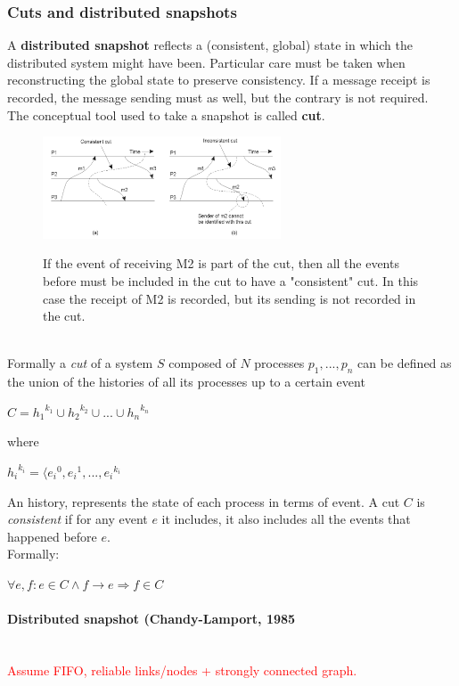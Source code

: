 \documentclass[10pt,a4paper]{article}
\newcommand{\myparagraph}[1]{\paragraph{#1}\mbox{}\\[0.05in]}
\begin{document}
\subsubsection{Cuts and distributed snapshots}
A \textbf{distributed snapshot} reflects a (consistent, global) state in which the distributed system might have been. Particular care must be taken when reconstructing the global state to preserve consistency. If a message receipt is recorded, the message sending must as well, but the contrary is not required. \\
The conceptual tool used to take a snapshot is called \textbf{cut}.
\begin{figure}[h!]
 \hfill \includegraphics[width=200pt]{images/cut.png}\hspace*{\fill}
  \label{fig:cut}
  \caption{If the event of receiving M2 is part of the cut, then all the events before must be included in the cut to have a "consistent" cut. In this case the receipt of M2 is recorded, but its sending is not recorded in the cut.}
\end{figure} \pagebreak \\
Formally a \textit{cut} of a system $S$ composed of $N$ processes $p_1, ..., p_n$ can be defined as the union of the histories of all its processes up to a certain event 
\begin{description}
	\item $C={h_1}^{k_1} \cup {h_2}^{k_2} \cup ... \cup {h_n}^{k_n}$ 
	\item where
	\item ${h_i}^{k_i}=\langle {e_i}^0, {e_i}^1, ..., {e_i}^{k_i}$
\end{description}
An history, represents the state of each process in terms of event.
A cut $C$ is \textit{consistent} if for any event $e$ it includes, it also includes all the events that happened before $e$. \\ Formally:
\begin{description}
	\item $\forall e,f : e \in C \wedge f \rightarrow e \Rightarrow f \in C$
\end{description} 
\myparagraph{Distributed snapshot (Chandy-Lamport, 1985}
\textcolor{Red}{Assume FIFO, reliable links/nodes + strongly connected graph.} \\
\end{document}
